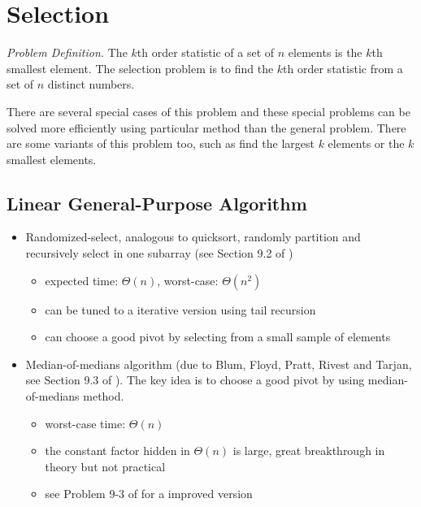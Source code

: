 \documentclass[12pt]{article}
\begin{document}
\section{Selection}

\emph{Problem Definition.}
    The $k$th order statistic of a set of $n$ elements is the $k$th
    smallest element.  The selection problem is to find the $k$th order
    statistic from a set of $n$ distinct numbers.

There are several special cases of this problem and these special problems
can be solved more efficiently using particular method than the general
problem.  There are some variants of this problem too, such as find the
largest $k$ elements or the $k$ smallest elements.

\subsection{Linear General-Purpose Algorithm}

\begin{itemize}
    \item Randomized-select, analogous to quicksort, randomly partition and
    recursively select in one subarray (see Section 9.2 of \cite{clrs2})
        \begin{itemize}
            \item expected time: $\Theta(n)$, worst-case: $\Theta(n^2)$
            \item can be tuned to a iterative version using tail recursion
            \item can choose a good pivot by selecting from a small sample
            of elements
        \end{itemize}
    \item Median-of-medians algorithm (due to Blum, Floyd, Pratt, Rivest
          and Tarjan, see Section 9.3 of \cite{clrs2}).  The key idea is to
          choose a good pivot by using median-of-medians method.
        \begin{itemize}
            \item worst-case time: $\Theta(n)$
            \item the constant factor hidden in $\Theta(n)$ is large, great
            breakthrough in theory but not practical
            \item see Problem 9-3 of \cite{clrs2} for a improved version
        \end{itemize}
\end{itemize}
\end{document}
